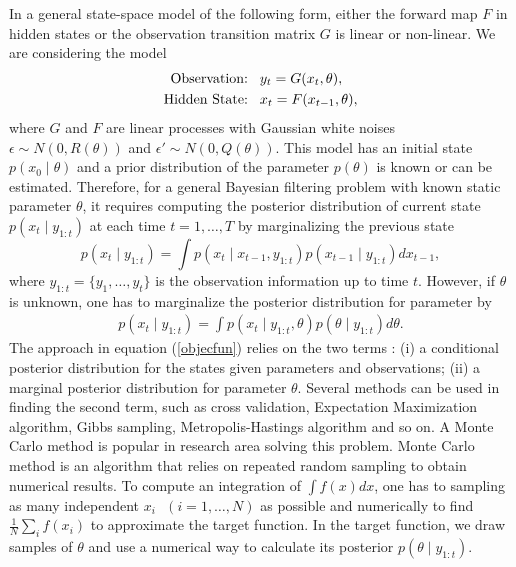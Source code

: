 In a general state-space model of the following form, either the forward map $F$ in hidden states or the observation transition matrix $G$ is linear or non-linear. We are considering the model 
\begin{align}\label{obserY}
\mbox{Observation:}\hspace*{0.3cm}   & y_t=G(x_t,\theta), \\
\mbox{Hidden State:}\hspace*{0.3cm} & x_t=F(x_{t-1},\theta),\label{hiddX}
\end{align}
where $G$ and $F$ are linear processes with Gaussian white noises $\epsilon\sim N(0,R(\theta))$ and $\epsilon'\sim N(0,Q(\theta))$. This model has an initial state $p(x_0\mid \theta)$ and a prior distribution of the parameter $p(\theta)$ is known or can be estimated. Therefore, for a general Bayesian filtering problem with known static parameter $\theta$, it requires computing the posterior distribution of current state $p(x_t \mid y_{1:t})$ at each time $t=1,\dots, T$ by marginalizing the previous state
\begin{equation*}
p(x_t\mid y_{1:t}) = \int p(x_t\mid x_{t-1},y_{1:t})p(x_{t-1}\mid y_{1:t}) dx_{t-1}, 
\end{equation*}
where $y_{1:t} = \{y_1,\dots,y_t\}$ is the observation information up to time $t$. However, if $\theta$ is unknown, one has to marginalize the posterior distribution for parameter by 
\begin{align}\label{objecfun}
p(x_t \mid y_{1:t}) = \int p(x_t \mid y_{1:t},\theta)p(\theta\mid y_{1:t})d\theta.
\end{align}
The approach in equation (\ref{objecfun}) relies on the two terms : (i) a conditional posterior distribution for the states given parameters and observations; (ii) a marginal posterior distribution for parameter $\theta$. Several methods can be used in finding the second term, such as cross validation, Expectation Maximization algorithm, Gibbs sampling, Metropolis-Hastings algorithm and so on. A Monte Carlo method is popular in research area solving this problem. Monte Carlo method is an algorithm that relies on repeated random sampling to obtain numerical results. To compute an integration of $\int f(x)dx$, one has to sampling as many independent $x_i \mbox{ } (i = 1,\dots, N)$ as possible and numerically to find $\frac{1}{N}\sum_i f(x_i)$ to approximate the target function. In the target function, we draw samples of $\theta$ and use a numerical way to calculate its posterior $p(\theta\mid y_{1:t})$. 


